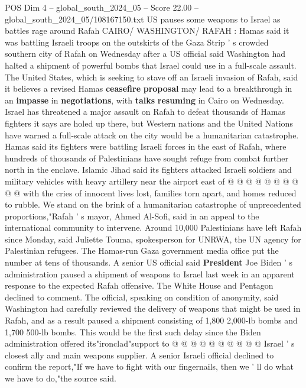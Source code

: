 \begin{textsample}{POS Dim 4 – global\_south\_2024\_05 – Score 22.00 – global\_south\_2024\_05/108167150.txt}  \label{ex:f4_pos_189}
US pauses some weapons to Israel as battles rage around Rafah CAIRO/ WASHINGTON/ RAFAH : Hamas said it was battling Israeli troops on the outskirts of the Gaza Strip ' s crowded southern city of Rafah on Wednesday after a US official said Washington had halted a shipment of powerful bombs that Israel could use in a full-scale assault.
The United States, which is seeking to stave off an Israeli invasion of Rafah, said it believes a revised Hamas \textbf{ceasefire} \textbf{proposal} may lead to a breakthrough in an \textbf{impasse} in \textbf{negotiations}, with \textbf{talks} \textbf{resuming} in Cairo on Wednesday.
Israel has threatened a major assault on Rafah to defeat thousands of Hamas fighters it says are holed up there, but Western nations and the United Nations have warned a full-scale attack on the city would be a humanitarian catastrophe.
Hamas said its fighters were battling Israeli forces in the east of Rafah, where hundreds of thousands of Palestinians have sought refuge from combat further north in the enclave.
Islamic Jihad said its fighters attacked Israeli soldiers and military vehicles with heavy artillery near the airport east of @ @ @ @ @ @ @ @ @ @ with the cries of innocent lives lost, families torn apart, and homes reduced to rubble.
We stand on the brink of a humanitarian catastrophe of unprecedented proportions,"Rafah ' s mayor, Ahmed Al-Sofi, said in an appeal to the international community to intervene.
Around 10,000 Palestinians have left Rafah since Monday, said Juliette Touma, spokesperson for UNRWA, the UN agency for Palestinian refugees.
The Hamas-run Gaza government media office put the number at tens of thousands.
A senior US official said \textbf{President} Joe Biden ' s administration paused a shipment of weapons to Israel last week in an apparent response to the expected Rafah offensive.
The White House and Pentagon declined to comment.
The official, speaking on condition of anonymity, said Washington had carefully reviewed the delivery of weapons that might be used in Rafah, and as a result paused a shipment consisting of 1,800 2,000-lb bombs and 1,700 500-lb bombs.
This would be the first such delay since the Biden administration offered its"ironclad"support to @ @ @ @ @ @ @ @ @ @ Israel ' s closest ally and main weapons supplier.
A senior Israeli official declined to confirm the report,"If we have to fight with our fingernails, then we ' ll do what we have to do,"the source said.

\end{textsample}
